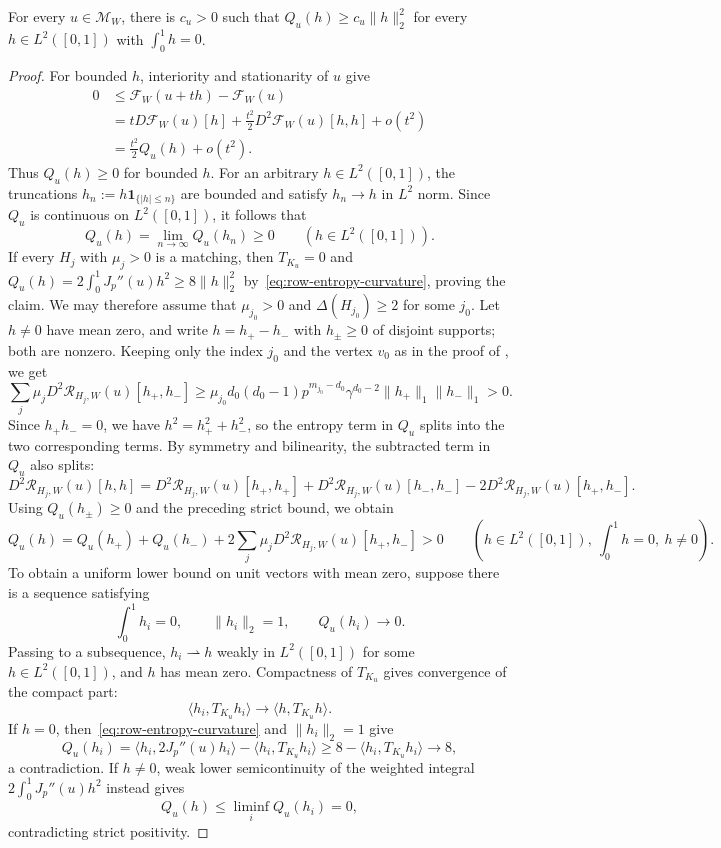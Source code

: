 \begin{lemma}\label{lem:row-lower-bound}
For every $u\in\mathcal M_W$, there is $c_u>0$ such that
$Q_u(h)\ge c_u\|h\|_2^2$ for every $h\in L^2([0,1])$ with $\int_0^1h=0$.
\end{lemma}

\begin{proof}
For bounded $h$, interiority and stationarity of $u$ give
\begin{align*}
  0&\le\mathcal F_W(u+th)-\mathcal F_W(u) \\
  &=tD\mathcal F_W(u)[h]+\frac{t^2}{2}D^2\mathcal F_W(u)[h,h]+o(t^2) \\
  &=\frac{t^2}{2}Q_u(h)+o(t^2).
\end{align*}
Thus $Q_u(h)\ge0$ for bounded $h$. For an arbitrary $h\in L^2([0,1])$, the
truncations $h_n:=h\mathbf1_{\{|h|\le n\}}$ are bounded and satisfy
$h_n\to h$ in $L^2$ norm.
Since $Q_u$ is continuous on $L^2([0,1])$, it follows that
\[
  Q_u(h)=\lim_{n\to\infty}Q_u(h_n)\ge0 \qquad (h\in L^2([0,1])).
\]
If every $H_j$ with $\mu_j>0$ is a matching, then $T_{K_u}=0$ and
$Q_u(h)=2\int_0^1J_p''(u)h^2\ge8\|h\|_2^2$
by~\eqref{eq:row-entropy-curvature}, proving the claim.
We may therefore assume that $\mu_{j_0}>0$ and $\Delta(H_{j_0})\ge2$
for some $j_0$.
Let $h\ne0$ have mean zero, and write $h=h_+-h_-$ with
$h_\pm\ge0$ of disjoint supports; both are nonzero.  Keeping only the index
$j_0$ and the vertex $v_0$ as in the proof of
, we get
\[
  \sum_j\mu_jD^2\mathcal R_{H_j,W}(u)[h_+,h_-]
  \ge\mu_{j_0}d_0(d_0-1)p^{m_{j_0}-d_0}\gamma^{d_0-2}
       \|h_+\|_1\|h_-\|_1>0.
\]
Since $h_+h_-=0$, we have $h^2=h_+^2+h_-^2$, so the entropy term
in $Q_u$ splits into the two corresponding terms. By symmetry and bilinearity,
the subtracted term in $Q_u$ also splits:
\[
  D^2\mathcal R_{H_j,W}(u)[h,h]
  =D^2\mathcal R_{H_j,W}(u)[h_+,h_+]
    +D^2\mathcal R_{H_j,W}(u)[h_-,h_-]
  -2D^2\mathcal R_{H_j,W}(u)[h_+,h_-].
\]
Using $Q_u(h_\pm)\ge0$ and the preceding strict bound, we obtain
\[
  Q_u(h)=Q_u(h_+)+Q_u(h_-)
    +2\sum_j\mu_jD^2\mathcal R_{H_j,W}(u)[h_+,h_-]>0
    \qquad (h\in L^2([0,1]),\ \int_0^1h=0,\ h\ne0).
\]
To obtain a uniform lower bound on unit vectors with mean zero, suppose
there is a sequence satisfying
\[
  \int_0^1h_i=0,\qquad \|h_i\|_2=1,\qquad Q_u(h_i)\longrightarrow0.
\]
Passing to a subsequence,
$h_i\rightharpoonup h$ weakly in $L^2([0,1])$ for some $h\in L^2([0,1])$,
and $h$ has mean zero.  Compactness of $T_{K_u}$ gives convergence of the compact part:
\[
  \langle h_i,T_{K_u}h_i\rangle\longrightarrow\langle h,T_{K_u}h\rangle.
\]
If $h=0$, then~\eqref{eq:row-entropy-curvature} and $\|h_i\|_2=1$ give
\[
  Q_u(h_i)=\langle h_i,2J_p''(u)h_i\rangle-\langle h_i,T_{K_u}h_i\rangle
  \ge8-\langle h_i,T_{K_u}h_i\rangle\longrightarrow8,
\]
a contradiction.  If $h\ne0$, weak lower semicontinuity of the weighted
integral $2\int_0^1J_p''(u)h^2$ instead gives
\[
  Q_u(h)\le\liminf_i Q_u(h_i)=0,
\]
contradicting strict positivity.
\end{proof}

